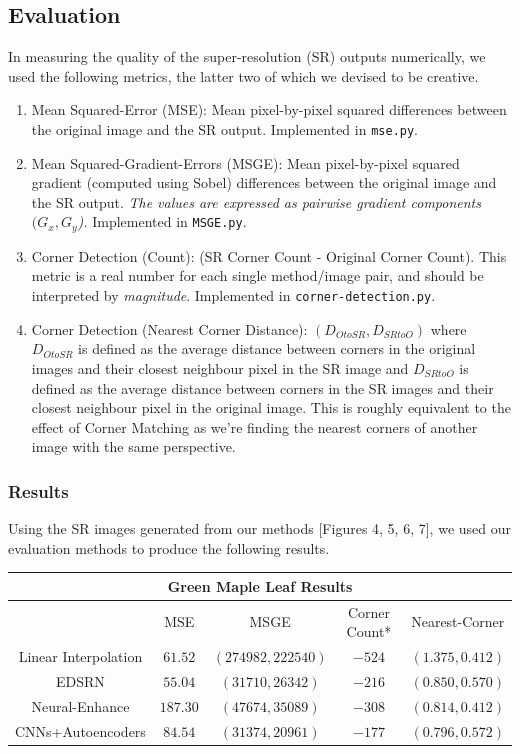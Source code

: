 \documentclass[letterpaper,12pt]{article}
\begin{document}
\subsection*{Evaluation}

In measuring the quality of the super-resolution (SR) outputs numerically, we used the following metrics, the latter two of which we devised to be creative.

\begin{enumerate}
    \item Mean Squared-Error (MSE): Mean pixel-by-pixel squared differences between the original image and the SR output. Implemented in \texttt{mse.py}.
    \item Mean Squared-Gradient-Errors (MSGE): Mean pixel-by-pixel squared gradient (computed using Sobel) differences between the original image and the SR output. \textit{The values are expressed as pairwise gradient components $(G_x, G_y$).} Implemented in \texttt{MSGE.py}.
    \item Corner Detection (Count): (SR Corner Count - Original Corner Count). This metric is a real number for each single method/image pair, and should be interpreted by \textit{magnitude}. Implemented in \texttt{corner-detection.py}.
    \item Corner Detection (Nearest Corner Distance): $(D_{OtoSR},D_{SRtoO})$ where $D_{OtoSR}$ is defined as the average distance between corners in the original images and their closest neighbour pixel in the SR image and $D_{SRtoO}$ is defined as the average distance between corners in the SR images and their closest neighbour pixel in the original image. This is roughly equivalent to the effect of Corner Matching as we're finding the nearest corners of another image with the same perspective.
\end{enumerate}

\pagebreak
\subsubsection*{Results}

Using the SR images generated from our methods [Figures 4, 5, 6, 7], we used our evaluation methods to produce the following results.

\begin{center}\begin{tabular}{ |c||c|c|c|c| }
    \hline
    \multicolumn{5}{|c|}{Green Maple Leaf Results} \\
    \hline
    & MSE & MSGE\* & Corner Count* & Nearest-Corner\\
    \hline
    Linear Interpolation & $61.52$ & $(274982, 222540)$ & $-524$ & $(1.375, 0.412)$\\
    EDSRN & $55.04$ & $(31710, 26342)$ & $-216$ & $(0.850, 0.570)$\\
    Neural-Enhance & $187.30$ & $(47674, 35089)$ & $-308$ & $(0.814, 0.412)$\\
    CNNs+Autoencoders & $84.54$ & $(31374, 20961)$ & $-177$ & $(0.796, 0.572)$\\
    \hline
\end{tabular}\end{center}
\end{document}
